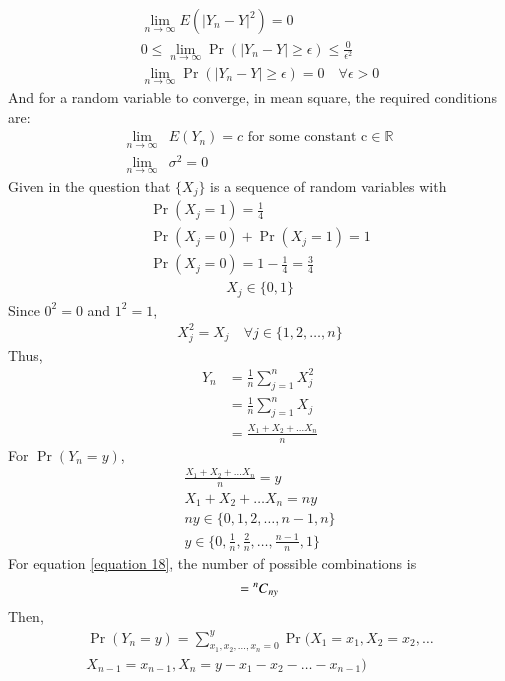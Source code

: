 \documentclass[journal,12pt,twocolumn]{IEEEtran}
\begin{document}
\begin{align}
    \lim_{n\rightarrow \infty} E(|Y_n-Y|^2) = 0 
    \\0 \leq  \lim_{n\rightarrow \infty}\Pr{(|Y_n-Y|\geq \epsilon)}  \leq \frac{0}{\epsilon^2}
    \\   \lim_{n\rightarrow \infty}\Pr{(|Y_n-Y|\geq \epsilon)} = 0 \quad \forall \epsilon >0
\end{align}
And for a random variable to converge, in mean square, the required conditions are:
\begin{align}
    \lim_{n\rightarrow \infty} &E(Y_n) = c \text{ for some constant c} \in \mathbb{R}
    \\\lim_{n\rightarrow\infty}  &\sigma ^{2} = 0
\end{align}
Given in the question that $\{X_j\}$ is a sequence of random variables with
\begin{align}
    \Pr{(X_j=1)} = \frac{1}{4}
    \\\Pr{(X_j=0)} + \Pr{(X_j=1)} = 1
    \\\Pr{(X_j=0)} = 1 - \frac{1}{4} = \frac{3}{4}
\end{align}
\begin{align}
    X_j \in \{0,1\} 
\end{align}
Since $0^2 = 0$ and $1^2 = 1$, 
\begin{align}
    X_j^2 = X_j \quad \forall j \in \{1, 2,\hdots, n\}
\end{align}
Thus, 
\begin{align}
    Y_n &= \frac{1}{n} \sum_{j=1}^{n}X_j^2 
    \\&= \frac{1}{n} \sum_{j=1}^{n}X_j
    \\&= \frac{X_1 + X_2 + \hdots X_n}{n}
\end{align}
For $\Pr{(Y_n = y)}$,
\begin{align}
    \frac{X_1 + X_2 + \hdots X_n}{n} = y
    \\X_1 + X_2 + \hdots X_n = ny \label{equation 18}
    \\ny \in \{0,1,2,\hdots,n-1,n\}
    \\y \in \{0, \frac{1}{n}, \frac{2}{n},\hdots,\frac{n-1}{n}, 1\}
\end{align}
For equation \eqref{equation 18}, the number of possible combinations is
\begin{align}
    = \comb[n]{ny}
\end{align}
Then,
\begin{multline}
    \Pr{(Y_n = y)} = \sum_{x_1,x_2,\hdots,x_n=0}^{y} \Pr(X_1=x_1, X_2=x_2,\hdots \\ X_{n-1}=x_{n-1},X_n=y-x_1-x_2-\hdots-x_{n-1})
\end{multline}
\end{document}
